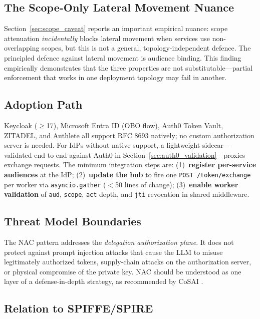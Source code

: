 \documentclass[journal]{IEEEtran}
\begin{document}
\subsection{The Scope-Only Lateral Movement Nuance}

Section~\ref{sec:scope_caveat} reports an important empirical nuance: scope
attenuation \textit{incidentally} blocks lateral movement when services use
non-overlapping scopes, but this is not a general, topology-independent defence.
The principled defence against lateral movement is audience binding. This
finding empirically demonstrates that the three properties are not
substitutable---partial enforcement that works in one deployment topology may fail
in another.

\subsection{Adoption Path}

Keycloak ($\geq$17), Microsoft Entra ID (OBO flow), Auth0 Token Vault, ZITADEL,
and Authlete all support RFC 8693 natively; no custom authorization server is
needed. For IdPs without native support, a lightweight sidecar---validated
end-to-end against Auth0 in Section~\ref{sec:auth0_validation}---proxies
exchange requests. The minimum integration steps are:
(1)~\textbf{register per-service audiences} at the IdP;
(2)~\textbf{update the hub} to fire one \texttt{POST /token/exchange} per worker
via \texttt{asyncio.gather} ($<$50 lines of change);
(3)~\textbf{enable worker validation} of \texttt{aud}, \texttt{scope}, \texttt{act}
depth, and \texttt{jti} revocation in shared middleware.

\subsection{Threat Model Boundaries}

The NAC pattern addresses the \textit{delegation authorization plane}. It does
not protect against prompt injection attacks that cause the LLM to misuse
legitimately authorized tokens, supply-chain attacks on the authorization server,
or physical compromise of the private key. NAC should be understood as one layer
of a defense-in-depth strategy, as recommended by CoSAI \cite{cosai_mcp}.

\subsection{Relation to SPIFFE/SPIRE}
\end{document}
